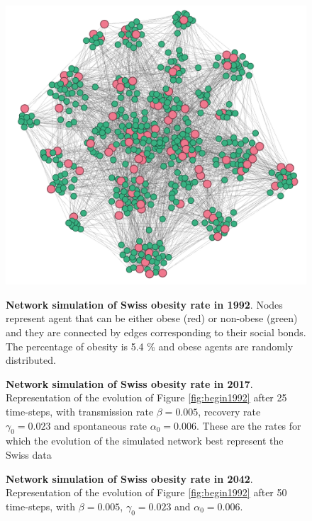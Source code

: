 \documentclass[11pt]{article}
\begin{document}
\begin{figure}[!htb]
\begin{minipage}{.3\linewidth}
\end{minipage}%
\hfill%
\begin{minipage}{.3\linewidth}
    \centering
    \includegraphics[width=\linewidth]{figures/end2042.png}
\end{minipage}%
\hfill%
\begin{minipage}[t]{.3\linewidth}
    \caption{\label{fig:begin1992} \textbf{Network simulation of Swiss obesity rate in 1992}. Nodes represent agent that can be either obese (red) or non-obese (green) and they are connected by edges corresponding to their social bonds. The percentage of obesity is 5.4 \% \cite{bmistatistics} and obese agents are randomly distributed.}
\end{minipage}%
\hfill%
\begin{minipage}[t]{.3\linewidth}
    \caption{\label{fig:end2017} \textbf{Network simulation of Swiss obesity rate in 2017}. Representation of the evolution of Figure \ref{fig:begin1992} after 25 time-steps, with transmission rate $\beta = 0.005 $, recovery rate $\gamma_0 = 0.023$ and spontaneous rate $\alpha_0 = 0.006$. These are the rates for which the evolution of the simulated network best represent the Swiss data \cite{bmistatistics}}
\end{minipage}%
\hfill%
\begin{minipage}[t]{.3\linewidth}
    \caption{\label{fig:end2042} \textbf{Network simulation of Swiss obesity rate in 2042}. Representation of the evolution of Figure \ref{fig:begin1992} after 50 time-steps, with $\beta = 0.005 $, $\gamma_0 = 0.023$ and $\alpha_0 = 0.006$. }
\end{minipage}%
\end{figure}
\end{document}
